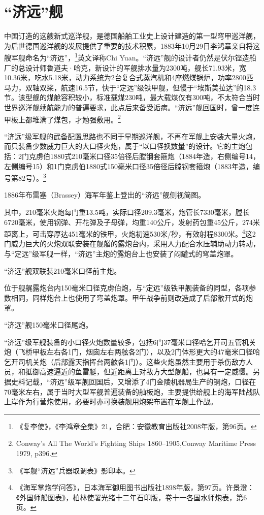 \documentclass[12pt,UTF8]{ctexbook}
\begin{document}
\section{“济远”舰}

中国订造的这艘新式巡洋舰，是德国船舶工业史上设计建造的第一型穹甲巡洋舰，为后世德国巡洋舰的发展提供了重要的技术积累，1883年10月29日李鸿章亲自将这艘军舰命名为“济远”，\footnote{《复李使》，《李鸿章全集》21，合肥：安徽教育出版社2008年版，第96页。}英文译称Chi Yuan。“济远”舰的设计者仍然是伏尔铿造船厂的总设计师鲁道夫·哈克，新设计的军舰排水量为2300吨，舰长71.93米，宽10.36米，吃水5.18米，动力系统为2台复合式蒸汽机和4座燃煤锅炉，功率2800匹马力，双轴双桨，航速16.5节，快于“定远”级铁甲舰，但慢于“埃斯美拉达”的18.3节。该型舰的煤舱容积较小，标准载煤230吨，最大载煤仅有300吨，不太符合当时世界巡洋舰续航能力的普遍要求，此点后来备受诟病。“济远”舰回国时，曾一度连甲板上都堆满了煤包，才勉强敷用。\footnote{Conway's All The World's Fighting Ships 1860--1905,Conway Maritime Press 1979, p396.}

“济远”级军舰的武备配置思路也不同于早期巡洋舰，不再在军舰上安装大量火炮，而只装备少数威力巨大的大口径火炮，属于“以口径换数量”的设计。它的主炮包括：2门克虏伯1880式210毫米口径35倍径后膛钢套箍炮（1884年造，右侧编号14，左侧编号15）和1门克虏伯1880式150毫米口径35倍径后膛钢套箍炮（1883年造，编号第82号）。\footnote{《军舰“济远”兵器取调表》影印本。}

1886年布雷塞（Brassey）海军年鉴上登出的“济远”舰侧视简图。

其中，210毫米火炮每门重13.5吨，实际口径209.3毫米，炮管长7330毫米，膛长6720毫米，使用钢弹、开花弹及子母弹，均重140公斤，发射药包重45公斤，274米距离上，可击穿厚达451毫米的铁甲，火炮初速530米/秒，有效射程8300米。\footnote{《海军掌炮学问答》，日本海军御用图书出版社1898年版，第97页。许景澄：《外国师船图表》，柏林使署光绪十二年石印版，卷十一各国水师炮表，第6页。}这2门威力巨大的火炮双联安装在舰艏的露炮台内，采用人力配合水压辅助动力转动，与“定远”级军舰一样，“济远”主炮的露炮台上也安装了闷罐式的穹盖炮罩。

“济远”舰双联装210毫米口径前主炮。

位于舰艉露炮台内150毫米口径克虏伯炮，与“定远”级铁甲舰装备的同型，各项参数相同，同样炮台上也使用了穹盖炮罩。甲午战争前则改造成了后部敞开式的炮罩。

“济远”舰150毫米口径尾炮。

“济远”级军舰装备的小口径火炮数量较多，包括6门37毫米口径哈乞开司五管机关炮（飞桥甲板左右各1门，烟囱左右两舷各2门），以及2门体形更大的47毫米口径哈乞开司机关炮（后部露天指挥台两舷各1门）。这些火炮虽然主要用于杀伤敌方人员，和抵御高速逼近的鱼雷艇，但近距离上对敌方大型舰船，也具有一定威慑。另据史料记载，“济远”级军舰回国后，又增添了4门金陵机器局生产的铜炮，口径在70毫米左右，属于当时大型军舰普遍装备的舢板炮，主要提供给舰上的海军陆战队上岸作为行营炮使用，必要时亦可换装舰用炮架布置在军舰上作战。
\end{document}
